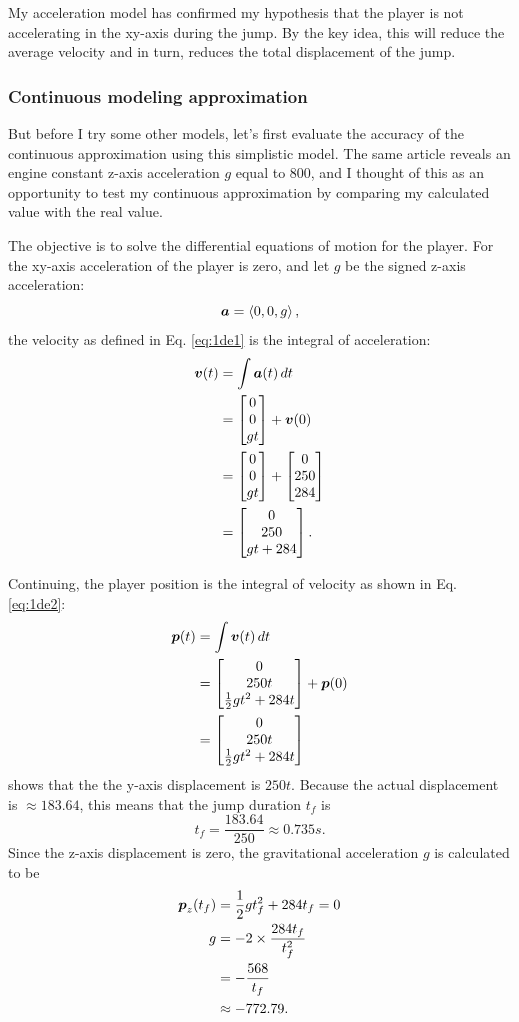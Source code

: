 My acceleration model has confirmed my hypothesis that the player is not accelerating in the xy-axis during the jump. By the key idea, this will reduce the average velocity and in turn, reduces the total displacement of the jump.

\subsubsection{Continuous modeling approximation}
But before I try some other models, let's first evaluate the accuracy of the continuous approximation using this simplistic model. The same article reveals an engine constant z-axis acceleration $g$ equal to $800$, and I thought of this as an opportunity to test my continuous approximation by comparing my calculated value with the real value.

The objective is to solve the differential equations of motion for the player. For the xy-axis acceleration of the player is zero, and let $g$ be the signed z-axis acceleration:
\[
    \boldsymbol{a} = \left\langle 0, 0, g \right\rangle,
\]
the velocity as defined in Eq. \ref{eq:1de1} is the integral of acceleration:
\begin{align*}
    \boldsymbol{v}(t) &= \int \boldsymbol{a}(t) \, dt\\
    &= \begin{bmatrix}0\\0\\gt\end{bmatrix} + \boldsymbol{v}(0)\\
    &= \begin{bmatrix}0\\0\\gt\end{bmatrix} + \begin{bmatrix}0\\250\\284\end{bmatrix}\\
    &= \begin{bmatrix}0\\250\\gt + 284\end{bmatrix}.
\end{align*}

Continuing, the player position is the integral of velocity as shown in Eq. \ref{eq:1de2}:
\begin{align*}
    \boldsymbol{p}(t) &= \int \boldsymbol{v}(t) \, dt\\
    &= \begin{bmatrix}0\\250t\\\frac{1}{2}gt^2 + 284t\end{bmatrix} + \boldsymbol{p}(0)\\
    &= \begin{bmatrix}0\\250t\\\frac{1}{2}gt^2 + 284t\end{bmatrix}
\end{align*}
shows that the the y-axis displacement is $250t$. Because the actual displacement is $\approx 183.64$, this means that the jump duration $t_f$ is
\[
    t_f = \frac{183.64}{250} \approx 0.735 \si{s}.
\]
Since the z-axis displacement is zero, the gravitational acceleration $g$ is calculated to be
\begin{align*}
    \boldsymbol{p}_{z}(t_f) &= \frac{1}{2}gt_f^2 + 284t_f = 0\\
    g &= - 2 \times \frac{284t_f}{t_f^2}\\
    &= -\frac{568}{t_f}\\
    &\approx -772.79.
\end{align*}

